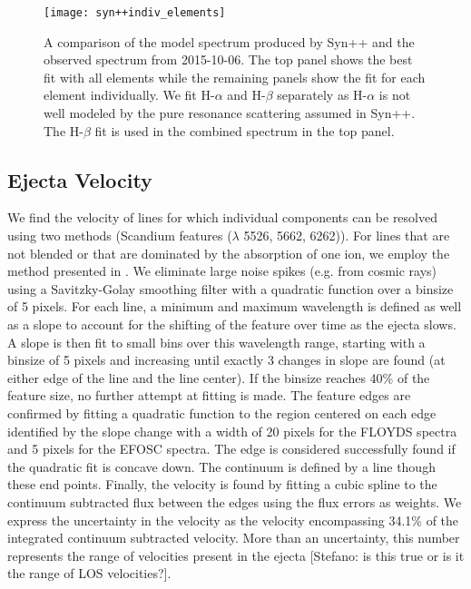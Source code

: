 \documentclass[preprint]{aastex61}
\newcommand{\stefanocomment}[1]{{\color{cyan} [{#1}]}}
\newcommand{\Stefano}[1]{\stefanocomment{Stefano: #1}}
\begin{document}
\begin{figure}[htbp]
\begin{center}
\texttt{[image: syn++indiv\_elements]} %
\caption{A comparison of the model spectrum produced by Syn++ and the observed spectrum from 2015-10-06.
The top panel shows the best fit with all elements while the remaining panels show the fit for each element individually.
We fit H-$\alpha$ and H-$\beta$ separately as H-$\alpha$ is not well modeled by the pure resonance scattering assumed in Syn++.
The H-$\beta$ fit is used in the combined spectrum in the top panel.}
\label{fig:syn++}
\end{center}
\end{figure}
\subsection{Ejecta Velocity}
We find the velocity of lines for which individual components can be resolved using two methods (Scandium features ($\lambda$ 5526, 5662, 6262)).
For lines that are not blended or that are dominated by the absorption of one ion, we employ the method presented in \citet{2012silverman}. 
We eliminate large noise spikes (e.g. from cosmic rays) using a Savitzky-Golay smoothing filter \citep{1964savitzky} with a quadratic function over a binsize of 5 pixels. 
For each line, a minimum and maximum wavelength is defined as well as a slope to account for the shifting of the feature over time as the ejecta slows. 
A slope is then fit to small bins over this wavelength range, starting with a binsize of 5 pixels and increasing until exactly 3 changes in slope are found (at either edge of the line and the line center). 
If the binsize reaches 40\% of the feature size, no further attempt at fitting is made. 
The feature edges are confirmed by fitting a quadratic function to the region centered on each edge identified by the slope change with a width of 20 pixels for the FLOYDS spectra and 5 pixels for the EFOSC spectra. 
The edge is considered successfully found if the quadratic fit is concave down. 
The continuum is defined by a line though these end points.
Finally, the velocity is found by fitting a cubic spline to the continuum subtracted flux between the edges using the flux errors as weights. 
We express the uncertainty in the velocity as the velocity encompassing 34.1\% of the integrated continuum subtracted velocity.
More than an uncertainty, this number represents the range of velocities present in the ejecta \Stefano{is this true or is it the range of LOS velocities?}.
\end{document}
